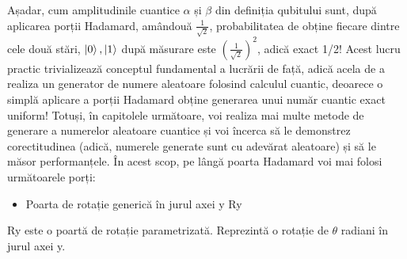 Așadar, cum amplitudinile cuantice $\alpha$ și $\beta$ din definiția qubitului sunt, după aplicarea porții Hadamard, amândouă $\frac{1}{\sqrt{2}}$, probabilitatea de obține fiecare dintre cele două stări, $\ket{0}, \ket{1}$ după măsurare este $(\frac{1}{\sqrt{2}})^2$, adică exact 1/2! Acest lucru practic trivializează conceptul fundamental a lucrării de față, adică acela de a realiza un generator de numere aleatoare folosind calculul cuantic, deoarece o simplă aplicare a porții Hadamard obține generarea unui număr cuantic exact uniform! Totuși, în capitolele următoare, voi realiza mai multe metode de generare a numerelor aleatoare cuantice și voi încerca să le demonstrez corectitudinea (adică, numerele generate sunt cu adevărat aleatoare) și să le măsor performanțele. În acest scop, pe lângă poarta Hadamard voi mai folosi următoarele porți:

\begin{itemize}
    \item Poarta de rotație generică în jurul axei y Ry
\end{itemize}
Ry este o poartă de rotație parametrizată. Reprezintă o rotație de $\theta$ radiani în jurul axei y.

